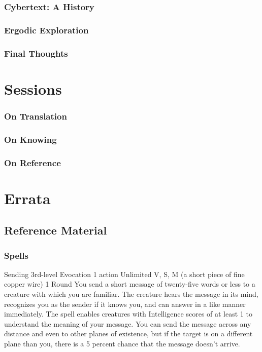 \documentclass[10pt,twoside,twocolumn,openany,nomultitoc]{book}
\begin{document}
\section{Cybertext: A History}
    \lipsum[3]
\section{Ergodic Exploration}
    \lipsum[4]
\section{Final Thoughts}
    \lipsum[5]



\part{Sessions}
\section{On Translation}
    \lipsum[1]
\section{On Knowing}
    \lipsum[2]
\section{On Reference}
    \lipsum[3]
    
\part{Errata}
\chapter{Reference Material}

\section{Spells}
    \DndSpellHeader%
      {Sending}
      {3rd-level Evocation}
      {1 action}
      {Unlimited}
      {V, S, M (a short piece of fine copper wire)}
      {1 Round}
            You send a short message of twenty-five words or less to a creature with which you are familiar. The creature hears the message in its mind, recognizes you as the sender if it knows you, and can answer in a like manner immediately. The spell enables creatures with Intelligence scores of at least 1 to understand the meaning of your message.
            You can send the message across any distance and even to other planes of existence, but if the target is on a different plane than you, there is a 5 percent chance that the message doesn't arrive.
            
\end{document}
